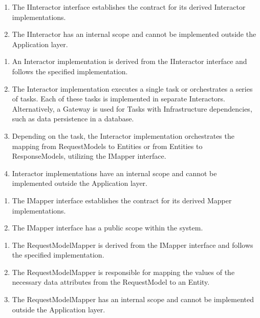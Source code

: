 \begin{enumerate}[label=\themycounter.\arabic*]
    \item The IInteractor interface establishes the contract for its derived Interactor
    implementations.
    \item The IInteractor has an internal scope and cannot be implemented outside the
    Application layer.
\end{enumerate}

\begin{enumerate}[label=\themycounter.\arabic*]
    \item An Interactor implementation is derived from the IInteractor interface and
    follows the specified implementation.
    \item The Interactor implementation executes a single task or orchestrates a series of
    tasks. Each of these tasks is implemented in separate Interactors. Alternatively, a
    Gateway is used for Tasks with Infrastructure dependencies, such as data persistence
    in a database.
    \item Depending on the task, the Interactor implementation orchestrates the mapping
    from RequestModels to Entities or from Entities to ResponseModels, utilizing the
    IMapper interface.
    \item Interactor implementations have an internal scope and cannot be implemented
    outside the Application layer.
\end{enumerate}

\begin{enumerate}[label=\themycounter.\arabic*]
    \item The IMapper interface establishes the contract for its derived Mapper
    implementations.
    \item The IMapper interface has a public scope within the system.
\end{enumerate}

\begin{enumerate}[label=\themycounter.\arabic*]
    \item The RequestModelMapper is derived from the IMapper interface and follows the
    specified implementation.
    \item The RequestModelMapper is responsible for mapping the values of the necessary
    data attributes from the RequestModel to an Entity.
    \item The RequestModelMapper has an internal scope and cannot be implemented outside
    the Application layer.
\end{enumerate}

